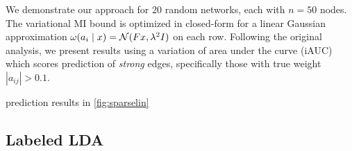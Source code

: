 
We demonstrate our approach for 20 random networks, each with $n=50$
nodes.  The variational MI bound is optimized in closed-form for a
linear Gaussian approximation $\omega(a_i \mid x)
= \mathcal{N}(Fx, \lambda^2 I)$ on each row.  Following the original
analysis, we present results using a variation of area under the curve
(iAUC) which scores prediction of \emph{strong} edges, specifically
those with true weight $|a_{ij}| > 0.1$.

prediction results in \FIG\ref{fig:sparselin}

\subsection{Labeled LDA}\label{sec:llda}

      

